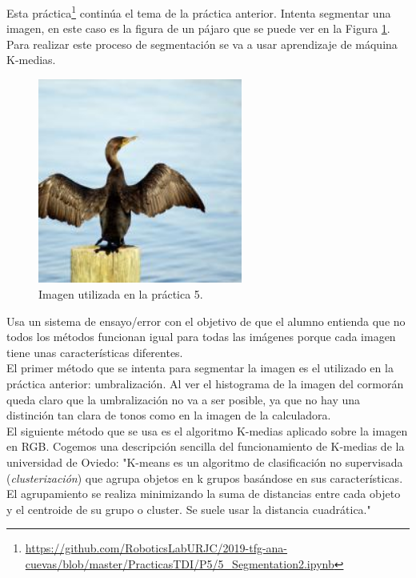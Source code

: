 Esta práctica\footnote{\url{https://github.com/RoboticsLabURJC/2019-tfg-ana-cuevas/blob/master/PracticasTDI/P5/5_Segmentation2.ipynb}} continúa el tema de la práctica anterior. Intenta segmentar una imagen, en este caso es la figura de un pájaro que se puede ver en la Figura \ref{cormoran}. Para realizar este proceso de segmentación se va a usar aprendizaje de máquina K-medias.\\
\begin{figure}[h]
\centering
\includegraphics[width=0.6\textwidth]{imagenes/cormoran_rgb}
\caption{Imagen utilizada en la práctica 5.}
\label{cormoran}
\end{figure}

Usa un sistema de ensayo/error con el objetivo de que el alumno entienda que no todos los métodos funcionan igual para todas las imágenes porque cada imagen tiene unas características diferentes.\\

El primer método que se intenta para segmentar la imagen es el utilizado en la práctica anterior: umbralización. Al ver el histograma de la imagen del cormorán queda claro que la umbralización no va a ser posible, ya que no hay una distinción tan clara de tonos como en la imagen de la calculadora.\\

El siguiente método que se usa es el algoritmo K-medias aplicado sobre la imagen en RGB. Cogemos una descripción sencilla del funcionamiento de K-medias de la universidad de Oviedo: "K-means es un algoritmo de clasificación no supervisada (\emph{clusterización}) que agrupa objetos en k grupos basándose en sus características. El agrupamiento se realiza minimizando la suma de distancias entre cada objeto y el centroide de su grupo o cluster. Se suele usar la distancia cuadrática."\\

